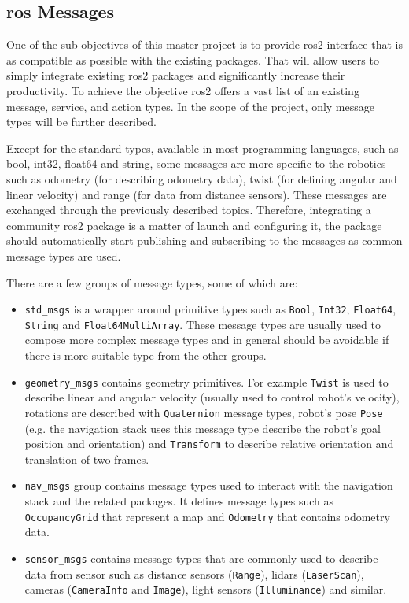 \subsection{\ac{ros} Messages}
One of the sub-objectives of this master project is to provide \ac{ros2} interface that is as compatible as possible with the existing packages. That will allow users to simply integrate existing \ac{ros2} packages and significantly increase their productivity. To achieve the objective \ac{ros2} offers a vast list of an existing message, service, and action types. In the scope of the project, only message types will be further described.

Except for the standard types, available in most programming languages, such as bool, int32, float64 and string, some messages are more specific to the robotics such as odometry (for describing odometry data), twist (for defining angular and linear velocity) and range (for data from distance sensors). These messages are exchanged through the previously described topics. Therefore, integrating a community \ac{ros2} package is a matter of launch and configuring it, the package should automatically start publishing and subscribing to the messages as common message types are used.

There are a few groups of message types, some of which are:
\begin{itemize}
    \item \texttt{std\_msgs} is a wrapper around primitive types such as \texttt{Bool}, \texttt{Int32}, \texttt{Float64}, \texttt{String} and \texttt{Float64MultiArray}. These message types are usually used to compose more complex message types and in general should be avoidable if there is more suitable type from the other groups.
    \item \texttt{geometry\_msgs} contains geometry primitives. For example \texttt{Twist} is used to describe linear and angular velocity (usually used to control robot's velocity), rotations are described with \texttt{Quaternion} message types, robot's pose \texttt{Pose} (e.g. the navigation stack uses this message type describe the robot's goal position and orientation) and \texttt{Transform} to describe relative orientation and translation of two frames.
    \item \texttt{nav\_msgs} group contains message types used to interact with the navigation stack and the related packages. It defines message types such as \texttt{OccupancyGrid} that represent a map and \texttt{Odometry} that contains odometry data. 
    \item \texttt{sensor\_msgs} contains message types that are commonly used to describe data from sensor such as distance sensors (\texttt{Range}), \acsp{lidar} (\texttt{LaserScan}), cameras (\texttt{CameraInfo} and \texttt{Image}), light sensors (\texttt{Illuminance}) and similar. 
\end{itemize}

